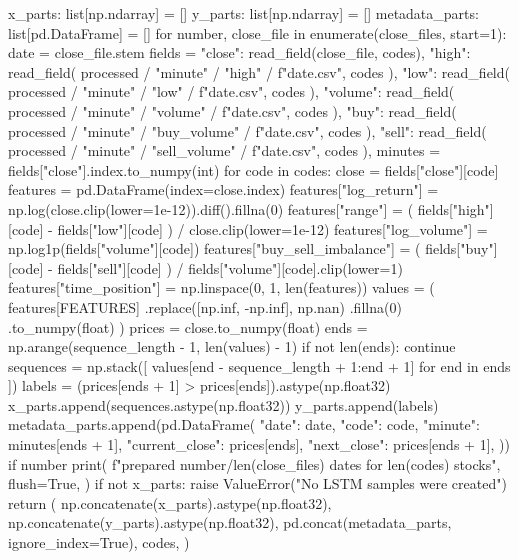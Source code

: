 \documentclass[UTF8,a4paper,fontset=fandol]{ctexart}
\begin{document}
\begin{ProjectCode}
    x_parts: list[np.ndarray] = []
    y_parts: list[np.ndarray] = []
    metadata_parts: list[pd.DataFrame] = []
    for number, close_file in enumerate(close_files, start=1):
        date = close_file.stem
        fields = {
            "close": read_field(close_file, codes),
            "high": read_field(
                processed / "minute" / "high" / f"{date}.csv", codes
            ),
            "low": read_field(
                processed / "minute" / "low" / f"{date}.csv", codes
            ),
            "volume": read_field(
                processed / "minute" / "volume" / f"{date}.csv", codes
            ),
            "buy": read_field(
                processed / "minute" / "buy_volume" / f"{date}.csv", codes
            ),
            "sell": read_field(
                processed / "minute" / "sell_volume" / f"{date}.csv", codes
            ),
        }
        minutes = fields["close"].index.to_numpy(int)
        for code in codes:
            close = fields["close"][code]
            features = pd.DataFrame(index=close.index)
            features["log_return"] = np.log(close.clip(lower=1e-12)).diff().fillna(0)
            features["range"] = (
                fields["high"][code] - fields["low"][code]
            ) / close.clip(lower=1e-12)
            features["log_volume"] = np.log1p(fields["volume"][code])
            features["buy_sell_imbalance"] = (
                fields["buy"][code] - fields["sell"][code]
            ) / fields["volume"][code].clip(lower=1)
            features["time_position"] = np.linspace(0, 1, len(features))
            values = (
                features[FEATURES]
                .replace([np.inf, -np.inf], np.nan)
                .fillna(0)
                .to_numpy(float)
            )
            prices = close.to_numpy(float)
            ends = np.arange(sequence_length - 1, len(values) - 1)
            if not len(ends):
                continue
            sequences = np.stack([
                values[end - sequence_length + 1:end + 1]
                for end in ends
            ])
            labels = (prices[ends + 1] > prices[ends]).astype(np.float32)
            x_parts.append(sequences.astype(np.float32))
            y_parts.append(labels)
            metadata_parts.append(pd.DataFrame({
                "date": date,
                "code": code,
                "minute": minutes[ends + 1],
                "current_close": prices[ends],
                "next_close": prices[ends + 1],
            }))
        if number %
            print(
                f"prepared {number}/{len(close_files)} dates for {len(codes)} stocks",
                flush=True,
            )
    if not x_parts:
        raise ValueError("No LSTM samples were created")
    return (
        np.concatenate(x_parts).astype(np.float32),
        np.concatenate(y_parts).astype(np.float32),
        pd.concat(metadata_parts, ignore_index=True),
        codes,
    )



\end{ProjectCode}
\end{document}
